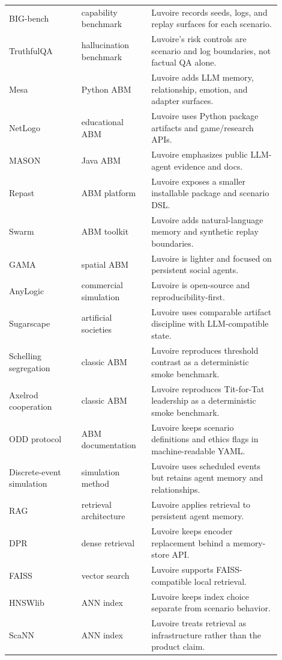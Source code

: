 \begin{longtable}{p{0.24\linewidth}p{0.23\linewidth}p{0.43\linewidth}}
BIG-bench & capability benchmark & Luvoire records seeds, logs, and replay surfaces for each scenario. \\
TruthfulQA & hallucination benchmark & Luvoire's risk controls are scenario and log boundaries, not factual QA alone. \\
Mesa & Python ABM & Luvoire adds LLM memory, relationship, emotion, and adapter surfaces. \\
NetLogo & educational ABM & Luvoire uses Python package artifacts and game/research APIs. \\
MASON & Java ABM & Luvoire emphasizes public LLM-agent evidence and docs. \\
Repast & ABM platform & Luvoire exposes a smaller installable package and scenario DSL. \\
Swarm & ABM toolkit & Luvoire adds natural-language memory and synthetic replay boundaries. \\
GAMA & spatial ABM & Luvoire is lighter and focused on persistent social agents. \\
AnyLogic & commercial simulation & Luvoire is open-source and reproducibility-first. \\
Sugarscape & artificial societies & Luvoire uses comparable artifact discipline with LLM-compatible state. \\
Schelling segregation & classic ABM & Luvoire reproduces threshold contrast as a deterministic smoke benchmark. \\
Axelrod cooperation & classic ABM & Luvoire reproduces Tit-for-Tat leadership as a deterministic smoke benchmark. \\
ODD protocol & ABM documentation & Luvoire keeps scenario definitions and ethics flags in machine-readable YAML. \\
Discrete-event simulation & simulation method & Luvoire uses scheduled events but retains agent memory and relationships. \\
RAG & retrieval architecture & Luvoire applies retrieval to persistent agent memory. \\
DPR & dense retrieval & Luvoire keeps encoder replacement behind a memory-store API. \\
FAISS & vector search & Luvoire supports FAISS-compatible local retrieval. \\
HNSWlib & ANN index & Luvoire keeps index choice separate from scenario behavior. \\
ScaNN & ANN index & Luvoire treats retrieval as infrastructure rather than the product claim. \\

\end{longtable}
